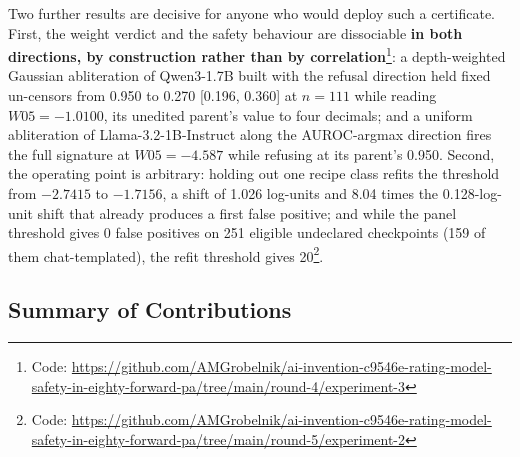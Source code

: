 \documentclass[11pt,letterpaper]{article}
\begin{document}
Two further results are decisive for anyone who would deploy such a certificate. First, the weight verdict and the safety behaviour are dissociable \textbf{in both directions, by construction rather than by correlation}\footnote{Code: \url{https://github.com/AMGrobelnik/ai-invention-c9546e-rating-model-safety-in-eighty-forward-pa/tree/main/round-4/experiment-3}}: a depth-weighted Gaussian abliteration of Qwen3-1.7B built with the refusal direction held fixed un-censors from 0.950 to 0.270 [0.196, 0.360] at $n = 111$ while reading $W05 = -1.0100$, its unedited parent's value to four decimals; and a uniform abliteration of Llama-3.2-1B-Instruct along the AUROC-argmax direction fires the full signature at $W05 = -4.587$ while refusing at its parent's 0.950. Second, the operating point is arbitrary: holding out one recipe class refits the threshold from $-2.7415$ to $-1.7156$, a shift of 1.026 log-units and 8.04 times the 0.128-log-unit shift that already produces a first false positive; and while the panel threshold gives 0 false positives on 251 eligible undeclared checkpoints (159 of them chat-templated), the refit threshold gives 20\footnote{Code: \url{https://github.com/AMGrobelnik/ai-invention-c9546e-rating-model-safety-in-eighty-forward-pa/tree/main/round-5/experiment-2}}.

\subsection{Summary of Contributions}
\end{document}
